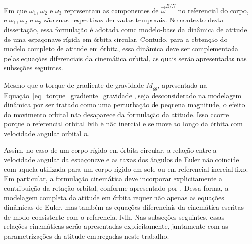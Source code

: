 Em que $\omega_1$, $\omega_2$ e $\omega_3$ representam as componentes de $\vec{\omega}^{B/N}$ no referencial do corpo, e $\dot{\omega}_1$, $\dot{\omega}_2$ e $\dot{\omega}_3$ são suas respectivas derivadas temporais.
No contexto desta dissertação, essa formulação é adotada como modelo-base da dinâmica de atitude de uma espaçonave rígida em órbita circular. Contudo, para a obtenção do modelo completo de atitude em órbita, essa dinâmica deve ser complementada pelas equações diferenciais da cinemática orbital, as quais serão apresentadas nas subseções seguintes.

Mesmo que o torque de gradiente de gravidade $\vec{M}_{gg}$, apresentado na Equação~\ref{eq_torque_gradiente_gravidade}, seja desconsiderado na modelagem dinâmica por ser tratado como uma perturbação de pequena magnitude, o efeito do movimento orbital não desaparece da formulação da atitude. Isso ocorre porque o referencial orbital \gls{lvlh} é não inercial e se move ao longo da órbita com velocidade angular orbital $n$.

Assim, no caso de um corpo rígido em órbita circular, a relação entre a velocidade angular da espaçonave e as taxas dos ângulos de Euler não coincide com aquela utilizada para um corpo rígido em solo ou em referencial inercial fixo. Em particular, a formulação cinemática deve incorporar explicitamente a contribuição da rotação orbital, conforme apresentado por \cite{wie2008space}. Dessa forma, a modelagem completa da atitude em órbita requer não apenas as equações dinâmicas de Euler, mas também as equações diferenciais da cinemática escritas de modo consistente com o referencial \gls{lvlh}. Nas subseções seguintes, essas relações cinemáticas serão apresentadas explicitamente, juntamente com as parametrizações da atitude empregadas neste trabalho.






